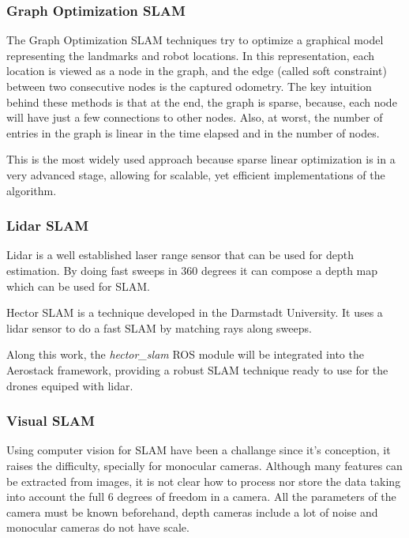     \subsubsection{Graph Optimization SLAM}

      The Graph Optimization SLAM techniques try to optimize a graphical model representing the landmarks and robot locations. In this representation, each location is viewed as a node in the graph, and the edge (called soft constraint) between two consecutive nodes is the captured odometry. The key intuition behind these methods is that at the end, the graph is sparse, because, each node will have just a few connections to other nodes. Also, at worst, the number of entries in the graph is linear in the time elapsed and in the number of nodes.

      This is the most widely used approach because sparse linear optimization is in a very advanced stage, allowing for scalable, yet efficient implementations of the algorithm.

    \subsubsection{Lidar SLAM}

      Lidar is a well established laser range sensor that can be used for depth estimation. By doing fast sweeps in 360 degrees it can compose a depth map which can be used for SLAM.

      Hector SLAM \cite{hector_slam} is a technique developed in the Darmstadt University. It uses a lidar sensor to do a fast SLAM by matching rays along sweeps.

      Along this work, the \textit{hector\_slam} ROS module will be integrated into the Aerostack framework, providing a robust SLAM technique ready to use for the drones equiped with lidar.

    \subsubsection{Visual SLAM}

      Using computer vision for SLAM have been a challange since it's conception, it raises the difficulty, specially for monocular cameras. Although many features can be extracted from images, it is not clear how to process nor store the data taking into account the full 6 degrees of freedom in a camera. All the parameters of the camera must be known beforehand, depth cameras include a lot of noise and monocular cameras do not have scale.

